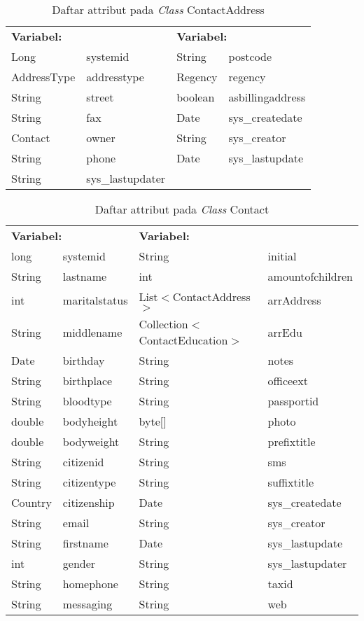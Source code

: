 \begin{table}[H]
	\caption{Daftar attribut pada \textit{Class} ContactAddress}
	\centering
	\small
	\begin{adjustbox}{width=1\textwidth}	
		\begin{tabular}{|p{4cm} p{2.1cm} p{3cm} p{3.1cm}|}
			\hline
			\multicolumn{2}{|l}{\textbf{Variabel:}}&\multicolumn{2}{l|}{\textbf{Variabel:}}\\
			Long&systemid&String&postcode\\
			AddressType&addresstype&Regency&regency\\
			String&street&boolean&asbillingaddress\\
			String&fax&Date&sys\_createdate\\
			Contact&owner&String&sys\_creator\\
			String&phone&Date&sys\_lastupdate\\
			String&sys\_lastupdater&&\\
			\hline
		\end{tabular}
	\end{adjustbox}
\end{table}
\begin{table}[H]
	\caption{Daftar attribut pada \textit{Class} Contact}
	\centering
	\small
	\begin{adjustbox}{width=1\textwidth}	
		\begin{tabular}{|p{2cm} p{2.1cm} p{5cm} p{3.1cm}|}
			\hline
			\multicolumn{2}{|l}{\textbf{Variabel:}}&\multicolumn{2}{l|}{\textbf{Variabel:}}\\
			long&systemid&String&initial\\
			String&lastname&int&amountofchildren\\
			int&maritalstatus&List$<$ContactAddress$>$&arrAddress\\
			String&middlename&Collection$<$ContactEducation$>$&arrEdu\\
			Date&birthday&String&notes\\
			String&birthplace&String&officeext\\
			String&bloodtype&String&passportid\\
			double&bodyheight&byte[]&photo\\
			double&bodyweight&String&prefixtitle\\
			String&citizenid&String&sms\\
			String&citizentype&String&suffixtitle\\
			Country&citizenship&Date&sys\_createdate\\
			String&email&String&sys\_creator\\
			String&firstname&Date&sys\_lastupdate\\
			int&gender&String&sys\_lastupdater\\
			String&homephone&String&taxid\\
			String&messaging&String&web\\
			\hline
		\end{tabular}
	\end{adjustbox}
\end{table}
